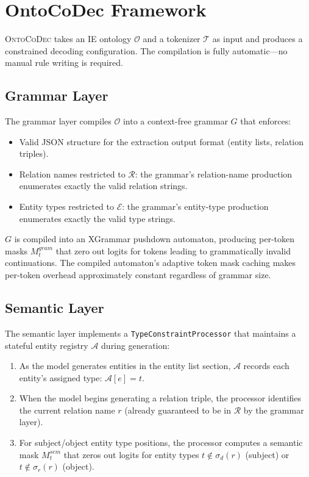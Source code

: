 \documentclass[11pt,a4paper]{article}
\begin{document}
\section{OntoCoDec Framework}
\label{sec:method}

\textsc{OntoCoDec} takes an IE ontology $\mathcal{O}$ and a tokenizer $\mathcal{T}$ as input and produces a constrained decoding configuration.
The compilation is fully automatic---no manual rule writing is required.

\subsection{Grammar Layer}

The grammar layer compiles $\mathcal{O}$ into a context-free grammar $G$ that enforces:
\begin{itemize}[leftmargin=*,nosep]
\item Valid JSON structure for the extraction output format (entity lists, relation triples).
\item Relation names restricted to $\mathcal{R}$: the grammar's relation-name production enumerates exactly the valid relation strings.
\item Entity types restricted to $\mathcal{E}$: the grammar's entity-type production enumerates exactly the valid type strings.
\end{itemize}

$G$ is compiled into an XGrammar pushdown automaton, producing per-token masks $M^{gram}_t$ that zero out logits for tokens leading to grammatically invalid continuations.
The compiled automaton's adaptive token mask caching makes per-token overhead approximately constant regardless of grammar size.

\subsection{Semantic Layer}

The semantic layer implements a \texttt{TypeConstraintProcessor} that maintains a stateful entity registry $\mathcal{A}$ during generation:

\begin{enumerate}[leftmargin=*,nosep]
\item As the model generates entities in the entity list section, $\mathcal{A}$ records each entity's assigned type: $\mathcal{A}[e] = t$.
\item When the model begins generating a relation triple, the processor identifies the current relation name $r$ (already guaranteed to be in $\mathcal{R}$ by the grammar layer).
\item For subject/object entity type positions, the processor computes a semantic mask $M^{sem}_t$ that zeros out logits for entity types $t \notin \sigma_d(r)$ (subject) or $t \notin \sigma_r(r)$ (object).
\end{enumerate}
\end{document}
